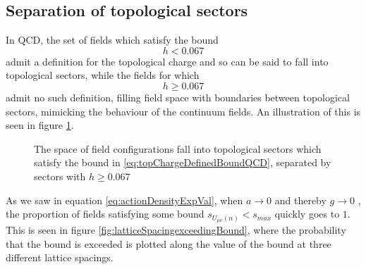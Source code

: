 \documentclass[a4paper,10pt]{book}
\begin{document}
\subsection{Separation of topological sectors}\label{sec:sepofTopSec}
In QCD, the set of fields which satisfy the bound \cite{PhillipsAnthony1986Lgfp}
\begin{equation}\label{eq:topChargeDefinedBoundQCD}
h<0.067
\end{equation}
admit a definition for the topological charge and so can be said to fall into topological sectors, while the fields for which 
\begin{equation}
h\geq 0.067
\end{equation}
admit no such definition, filling field space with boundaries between topological sectors, mimicking the behaviour of the continuum fields. An illustration of this is seen in figure \ref{fig:topologicalSectors_illustration}.
\begin{figure}
\centering
{}
\caption[Topological sectors in field configuration space]{The space of field configurations fall into topological sectors which satisfy the bound in \eqref{eq:topChargeDefinedBoundQCD}, separated by sectors with $h\geq 0.067$}\label{fig:topologicalSectors_illustration}
\end{figure}

As we saw in equation \eqref{eq:actionDensityExpVal}, when $a\rightarrow 0$ and thereby $g\rightarrow 0$ , the proportion of fields satisfying some bound $s_{U_{\mu \nu}(n)}<s_{max}$ quickly goes to $1$. This is seen in figure \ref{fig:latticeSpacingexceedingBound}, where the probability that the bound is exceeded is plotted along the value of the bound at three different lattice spacings.
\end{document}
